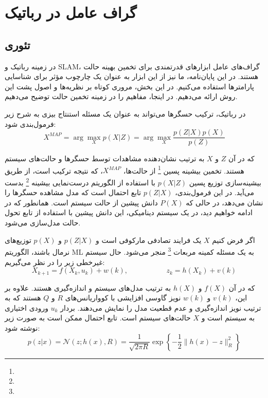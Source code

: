 \chapter{گراف عامل در رباتیک}

\section{تئوری}

در زمینه رباتیک و SLAM، گراف‌های عامل ابزارهای قدرتمندی برای تخمین بهینه حالت هستند. در این پایان‌نامه، ما نیز از این ابزار به عنوان یک چارچوب مؤثر برای شناسایی پارامترها استفاده می‌کنیم. در این بخش، مروری کوتاه بر نظریه‌ها و اصول پشت این روش ارائه می‌دهیم. در اینجا، مفاهیم را در زمینه تخمین حالت توضیح می‌دهیم.

در رباتیک، ترکیب حسگرها می‌تواند به عنوان یک مسئله استنتاج بیزی به شرح زیر فرمول‌بندی شود:
\begin{equation} \label{eq:MAP}
	X^{MAP} = \arg\max_X p(X|Z) = \arg\max_X \frac{p(Z|X)p(X)}{p(Z)}
\end{equation}

که در آن \(Z\) و \(X\) به ترتیب نشان‌دهنده مشاهدات توسط حسگرها و حالت‌های سیستم هستند. تخمین بیشینه پسین
\footnote{}
 از حالت‌ها، \(X^{MAP}\)، که نتیجه ترکیب است، از طریق بیشینه‌سازی توزیع پسین \(p(X|Z)\) با استفاده از الگوریتم درست‌نمایی بیشینه
\footnote{}
بدست می‌آید. در این فرمول‌بندی، \(p(Z|X)\) تابع احتمال است که مدل مشاهده حسگرها را نشان می‌دهد، در حالی که \(P(X)\) دانش پیشین از حالت سیستم است. همانطور که در ادامه خواهیم دید، در یک سیستم دینامیکی، این دانش پیشین با استفاده از تابع تحول حالت مدل‌سازی می‌شود.

اگر فرض کنیم \(X\) یک فرایند تصادفی مارکوفی است و \(p(Z|X)\) و \(p(X)\) توزیع‌های نرمال باشند، الگوریتم ML به یک مسئله کمینه مربعات
\footnote{}
 منجر می‌شود.  حال سیستم غیرخطی زیر را در نظر می‌گیریم:
\begin{equation}
	X_{k+1} = f(X_k, u_k) + w(k), \text{~~~~~~~~~~~~~~~~} z_k = h(X_k) + v(k)
\end{equation}


که در آن \(f(X)\) و \(h(X)\) به ترتیب مدل‌های سیستم و اندازه‌گیری هستند. علاوه بر این، \(v(k)\) و \(w(k)\) نویز گاوسی افزایشی با کوواریانس‌های \(R\) و \(Q\) هستند که به ترتیب نویز اندازه‌گیری و عدم قطعیت مدل را نمایش می‌دهند. بردار \(u_k\) ورودی اختیاری به سیستم است و \(X\) حالت‌های سیستم است. تابع احتمال ممکن است به صورت زیر نوشته شود:
\begin{equation}
	p(z|x) = \mathcal{N}(z; h(x), R) = \frac{1}{\sqrt{2\pi R}} \exp \left\{ -\frac{1}{2} \| h(x) - z \|_R^2 \right\}
\end{equation}

